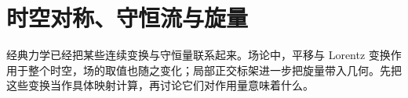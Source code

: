 \chapter{时空对称、守恒流与旋量}
\label{chap:math-spacetime}

经典力学已经把某些连续变换与守恒量联系起来。场论中，平移与 Lorentz 变换作用于整个时空，场的取值也随之变化；局部正交标架进一步把旋量带入几何。先把这些变换当作具体映射计算，再讨论它们对作用量意味着什么。




